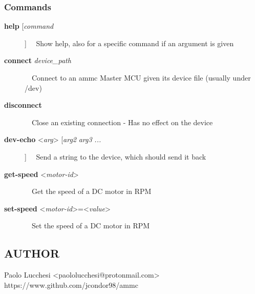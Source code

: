 \subsubsection*{Commands}
\begin{description}
  \item[\textbf{help} [\emph{command}]]
  \ \ Show help, also for a specific command if an argument is given

  \item[\textbf{connect} \emph{device\_path}]
  \ \ Connect to an ammc Master MCU given its device file (usually under /dev)

  \item[\textbf{disconnect}]
  \ \ Close an existing connection - Has no effect on the device

  \item[\textbf{dev-echo} <\emph{arg}> [\emph{arg2} \emph{arg3} \emph{...}]]
  \ \ Send a string to the device, which should send it back

  \item[\textbf{get-speed} <\emph{motor-id}>]
  \ \ Get the speed of a DC motor in RPM

  \item[\textbf{set-speed} <\emph{motor-id}>=<\emph{value}>]
  \ \ Set the speed of a DC motor in RPM
\end{description}

\subsection*{AUTHOR}
Paolo Lucchesi <paololucchesi@protonmail.com> \\
https://www.github.com/jcondor98/ammc
